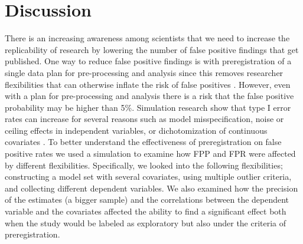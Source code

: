 \section{Discussion}
There is an increasing awareness among scientists that we need to increase the replicability of research by lowering the number of false positive findings that get published. One way to reduce false positive findings is with preregistration of a single data plan for pre-processing and analysis since this removes researcher flexibilities that can otherwise inflate the risk of false positives \citep{Simmons2011}. However, even with a plan for pre-processing and analysis there is a risk that the false positive probability may be higher than 5\%. Simulation research show that type I error rates can increase for several reasons such as model misspecification, noise or ceiling effects in independent variables, or dichotomization of continuous covariates \citep{Dennis2019, Litiere2007, Brunner2009, Austin2003, Austin2004}. To better understand the effectiveness of preregistration on false positive rates we used a simulation to examine how FPP and FPR were affected by different flexibilities. Specifically, we looked into the following flexibilities; constructing a model set with several covariates, using multiple outlier criteria, and collecting different dependent variables. We also examined how the precision of the estimates (a bigger sample) and the correlations between the dependent variable and the covariates affected the ability to find a significant effect both when the study would be labeled as exploratory but also under the criteria of preregistration. 


